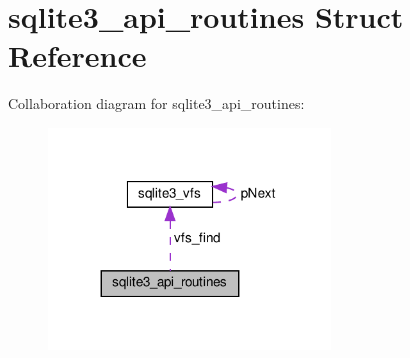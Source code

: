 \hypertarget{structsqlite3__api__routines}{}\section{sqlite3\+\_\+api\+\_\+routines Struct Reference}
\label{structsqlite3__api__routines}


Collaboration diagram for sqlite3\+\_\+api\+\_\+routines\+:
\nopagebreak
\begin{figure}[H]
\begin{center}
\leavevmode
\includegraphics[width=212pt]{structsqlite3__api__routines__coll__graph}
\end{center}
\end{figure}
